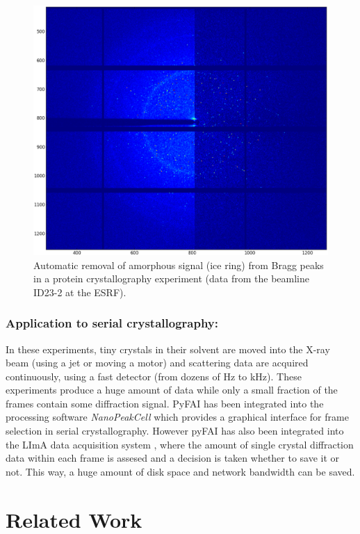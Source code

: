 \documentclass[preprint]{iucr}
\begin{document}
\begin{figure}
\label{separate}
\begin{center}
\includegraphics[width=15cm]{separate_id23.eps}
\caption{Automatic removal of amorphous signal (ice ring) from Bragg peaks in a
protein crystallography experiment (data from the beamline ID23-2 at
the ESRF).}
\end{center}
\end{figure}

\subsubsection{Application to serial crystallography:}
In these experiments, tiny crystals in their solvent are moved into
the X-ray beam (using a jet or moving a motor) and scattering data are acquired
continuously, using a fast detector (from dozens of Hz to kHz).
These experiments produce a huge amount of data while only a small fraction of the
frames contain some diffraction signal.
PyFAI has been integrated into the processing software \textit{NanoPeakCell}
which provides a graphical interface for frame selection in serial crystallography.
However pyFAI has also been integrated into the LImA data acquisition system
\cite{lima}, where the amount of single crystal diffraction data within each
frame is assesed and a decision is taken whether to save it or not.
This way, a huge amount of disk space and network bandwidth
can be saved.

\section{Related Work}
\end{document}
